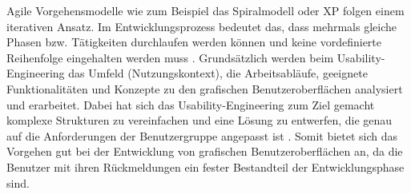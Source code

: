 Agile Vorgehensmodelle wie zum Beispiel das Spiralmodell oder \gls{XP} folgen einem iterativen Ansatz. Im Entwicklungsprozess bedeutet das, dass mehrmals gleiche Phasen bzw. Tätigkeiten durchlaufen werden können und keine vordefinierte Reihenfolge eingehalten werden muss \citep[vgl.][29\psqq]{Brandt2008}. Grundsätzlich werden beim Usability-Engineering das Umfeld (Nutzungskontext), die Arbeitsabläufe, geeignete Funktionalitäten und Konzepte zu den grafischen Benutzeroberflächen analysiert und erarbeitet. Dabei hat sich das Usability-Engineering zum Ziel gemacht komplexe Strukturen zu vereinfachen und eine Lösung zu entwerfen, die genau auf die Anforderungen der Benutzergruppe angepasst ist \citep[vgl.][7]{Richter2013}. Somit bietet sich das Vorgehen gut bei der Entwicklung von grafischen Benutzeroberflächen an, da die Benutzer mit ihren Rückmeldungen ein fester Bestandteil der Entwicklungsphase sind.

